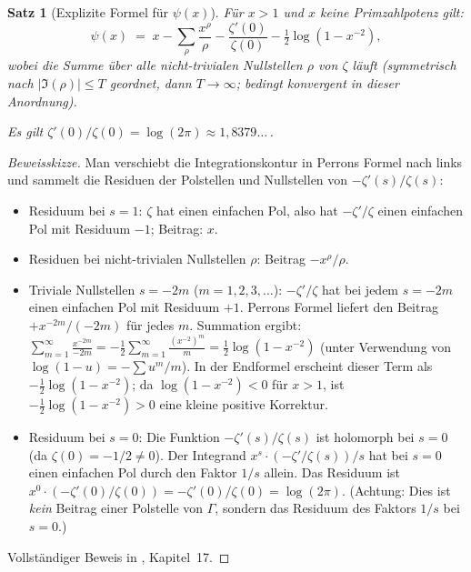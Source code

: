 \documentclass[12pt,a4paper]{amsart}
\newtheorem{theorem}{Satz}[section]
\theoremstyle{definition}
\begin{document}
\begin{theorem}[Explizite Formel f\"ur $\psi(x)$]
\label{thm:explicit_psi}
F\"ur $x > 1$ und $x$ keine Primzahlpotenz gilt:
\begin{equation}
  \label{eq:explicit_psi}
  \psi(x) \;=\; x - \sum_\rho \frac{x^\rho}{\rho}
  - \frac{\zeta'(0)}{\zeta(0)} - \tfrac{1}{2}\log(1 - x^{-2}),
\end{equation}
wobei die Summe \"uber alle nicht-trivialen Nullstellen $\rho$ von $\zeta$
l\"auft (symmetrisch nach $|\Im(\rho)| \le T$ geordnet, dann $T \to \infty$;
bedingt konvergent in dieser Anordnung).

Es gilt $\zeta'(0)/\zeta(0) = \log(2\pi) \approx 1{,}8379\ldots$\,.
\end{theorem}

\begin{proof}[Beweisskizze]
Man verschiebt die Integrationskontur in Perrons Formel nach links und
sammelt die Residuen der Polstellen und Nullstellen von $-\zeta'(s)/\zeta(s)$:
\begin{itemize}
  \item Residuum bei $s = 1$: $\zeta$ hat einen einfachen Pol,
    also hat $-\zeta'/\zeta$ einen einfachen Pol mit Residuum $-1$;
    Beitrag: $x$.
  \item Residuen bei nicht-trivialen Nullstellen $\rho$: Beitrag $-x^\rho/\rho$.
  \item Triviale Nullstellen $s = -2m$ ($m=1,2,3,\ldots$):
    $-\zeta'/\zeta$ hat bei jedem $s = -2m$ einen einfachen Pol mit Residuum $+1$.
    Perrons Formel liefert den Beitrag $+x^{-2m}/(-2m)$ f\"ur jedes $m$.
    Summation ergibt:
    $\displaystyle\sum_{m=1}^\infty \frac{x^{-2m}}{-2m}
     = -\tfrac{1}{2}\sum_{m=1}^\infty \frac{(x^{-2})^m}{m}
     = \tfrac{1}{2}\log(1-x^{-2})$
    (unter Verwendung von $\log(1-u)=-\sum u^m/m$).
    In der Endformel erscheint dieser Term als $-\tfrac{1}{2}\log(1-x^{-2})$;
    da $\log(1-x^{-2}) < 0$ f\"ur $x > 1$, ist $-\tfrac{1}{2}\log(1-x^{-2}) > 0$
    eine kleine positive Korrektur.
  \item Residuum bei $s = 0$: Die Funktion $-\zeta'(s)/\zeta(s)$ ist holomorph bei $s=0$
    (da $\zeta(0) = -1/2 \ne 0$). Der Integrand $x^s \cdot (-\zeta'/\zeta(s)) / s$ hat bei
    $s=0$ einen einfachen Pol durch den Faktor $1/s$ allein. Das Residuum ist
    $x^0 \cdot (-\zeta'(0)/\zeta(0)) = -\zeta'(0)/\zeta(0) = \log(2\pi)$.
    (Achtung: Dies ist \emph{kein} Beitrag einer Polstelle von $\Gamma$, sondern das
    Residuum des Faktors $1/s$ bei $s=0$.)
\end{itemize}
Vollst\"andiger Beweis in \cite{Davenport2000}, Kapitel~17.
\end{proof}
\end{document}
